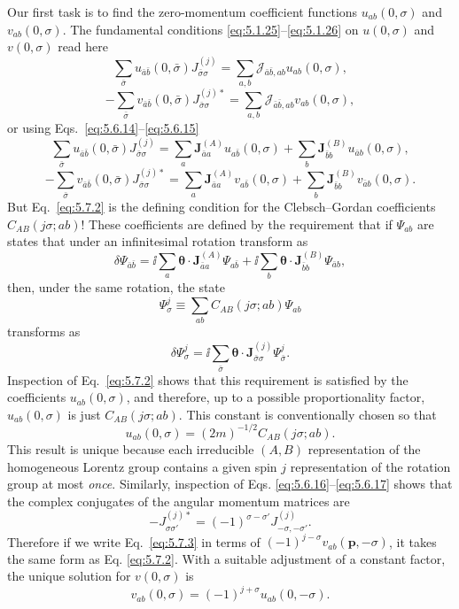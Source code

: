 Our first task is to find the zero-momentum coefficient functions
$u_{ab}(0,\sigma)$ and $v_{ab}(0,\sigma)$. The fundamental conditions
\eqref{eq:5.1.25}--\eqref{eq:5.1.26} on $u(0,\sigma)$ and $v(0,\sigma)$ read here
\[
\sum_{\bar\sigma}u_{\bar a\bar b}(0,\bar\sigma)
J^{(j)}_{\bar\sigma\sigma}
=\sum_{a,b}\mathcal J_{\bar a\bar b,ab}u_{ab}(0,\sigma),
\]
\[
-\sum_{\bar\sigma}v_{\bar a\bar b}(0,\bar\sigma)
J^{(j)*}_{\bar\sigma\sigma}
=\sum_{a,b}\mathcal J_{\bar a\bar b,ab}v_{ab}(0,\sigma),
\]
or using Eqs.~\eqref{eq:5.6.14}--\eqref{eq:5.6.15}
\begin{equation}
\sum_{\bar\sigma}u_{\bar a\bar b}(0,\bar\sigma)
J^{(j)}_{\bar\sigma\sigma}
=\sum_a\mathbf J^{(A)}_{\bar a a}u_{a\bar b}(0,\sigma)
+\sum_b\mathbf J^{(B)}_{\bar b b}u_{\bar a b}(0,\sigma),
\tag{5.7.2}\label{eq:5.7.2}
\end{equation}
\begin{equation}
-\sum_{\bar\sigma}v_{\bar a\bar b}(0,\bar\sigma)
J^{(j)*}_{\bar\sigma\sigma}
=\sum_a\mathbf J^{(A)}_{\bar a a}v_{a\bar b}(0,\sigma)
+\sum_b\mathbf J^{(B)}_{\bar b b}v_{\bar a b}(0,\sigma).
\tag{5.7.3}\label{eq:5.7.3}
\end{equation}
But Eq.~\eqref{eq:5.7.2} is the defining condition for the Clebsch--Gordan
coefficients $C_{AB}(j\sigma;ab)$! These coefficients are defined by the
requirement that if $\Psi_{ab}$ are states that under an infinitesimal rotation
transform as
\[
\delta\Psi_{\bar a\bar b}=\ii\sum_a\boldsymbol\theta\cdot
\mathbf J^{(A)}_{\bar a a}\Psi_{a\bar b}
+\ii\sum_b\boldsymbol\theta\cdot
\mathbf J^{(B)}_{\bar b b}\Psi_{\bar a b},
\]
then, under the same rotation, the state
\[
\Psi^j_\sigma\equiv\sum_{ab}C_{AB}(j\sigma;ab)\Psi_{ab}
\]
transforms as
\[
\delta\Psi^j_\sigma=\ii\sum_{\bar\sigma}\boldsymbol\theta\cdot
\mathbf J^{(j)}_{\bar\sigma\sigma}\Psi^j_{\bar\sigma}.
\]
Inspection of Eq.~\eqref{eq:5.7.2} shows that this requirement is satisfied by the
coefficients $u_{ab}(0,\sigma)$, and therefore, up to a possible
proportionality factor, $u_{ab}(0,\sigma)$ is just $C_{AB}(j\sigma;ab)$. This
constant is conventionally chosen so that
\begin{equation}
u_{ab}(0,\sigma)=(2m)^{-1/2}C_{AB}(j\sigma;ab).
\tag{5.7.4}\label{eq:5.7.4}
\end{equation}
This result is unique because each irreducible $(A,B)$ representation of the
homogeneous Lorentz group contains a given spin $j$ representation of the
rotation group at most \emph{once}. Similarly, inspection of Eqs.
\eqref{eq:5.6.16}--\eqref{eq:5.6.17} shows that the complex conjugates of the angular momentum
matrices are
\begin{equation}
-J^{(j)*}_{\sigma\sigma'}=(-1)^{\sigma-\sigma'}J^{(j)}_{-\sigma,-\sigma'}.
\tag{5.7.5}\label{eq:5.7.5}
\end{equation}
Therefore if we write Eq.~\eqref{eq:5.7.3} in terms of
$(-1)^{j-\sigma}v_{ab}(\mathbf p,-\sigma)$, it takes the same form as Eq.
\eqref{eq:5.7.2}. With a suitable adjustment of a constant factor, the unique solution
for $v(0,\sigma)$ is
\begin{equation}
v_{ab}(0,\sigma)=(-1)^{j+\sigma}u_{ab}(0,-\sigma).
\tag{5.7.6}\label{eq:5.7.6}
\end{equation}

